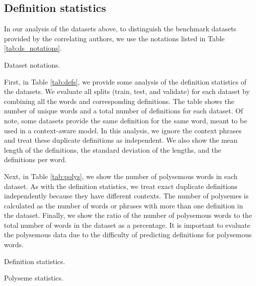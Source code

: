 \subsection{Definition statistics}

In our analysis of the datasets above, to distinguish the benchmark datasets
provided by the correlating authors, we use the notations listed in Table
\ref{tab:ds_notations}.

\begin{table}[h]
    \centering
    \caption{Dataset notations.}
    
    \label{tab:ds_notations}
\end{table}

First, in Table \ref{tab:defs}, we provide some analysis of the definition
statistics of the datasets. We evaluate all splits (train, test, and validate)
for each dataset by combining all the words and corresponding definitions. The
table shows the number of unique words and a total number of definitions for each
dataset. Of note, some datasets provide the same definition for the same word,
meant to be used in a context-aware model. In this analysis, we ignore the
context phrases and treat these duplicate definitions as independent. We also
show the mean length of the definitions, the standard deviation of the lengths,
and the definitions per word.


Next, in Table \ref{tab:polys}, we show the number of polysemous words in each
dataset. As with the definition statistics, we treat exact duplicate definitions
independently because they have different contexts. The number of polysemes is
calculated as the number of words or phrases with more than one definition
in the dataset. Finally, we show the ratio of the number of polysemous words to the total
number of words in the dataset as a percentage. It is important to evaluate the polysemous
data due to the difficulty of predicting definitions for polysemous words.

\begin{table}[h]
    \centering
    \caption{Definition statistics.}
    
    \label{tab:defs}
\end{table}

\begin{table}[h]
    \centering
    \caption{Polyseme statistics.}
    
    \label{tab:polys}
\end{table}


